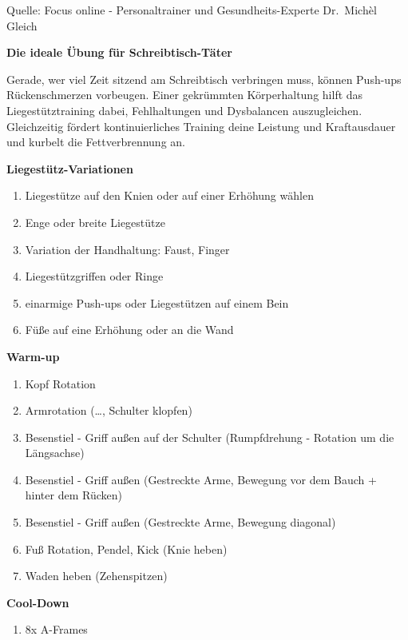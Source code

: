 Quelle: Focus online - Personaltrainer und Gesundheits-Experte
Dr.~Michèl Gleich

\textbf{Die ideale Übung für Schreibtisch-Täter}

Gerade, wer viel Zeit sitzend am Schreibtisch verbringen muss, können
Push-ups Rückenschmerzen vorbeugen. Einer gekrümmten Körperhaltung hilft
das Liegestütztraining dabei, Fehlhaltungen und Dysbalancen
auszugleichen. Gleichzeitig fördert kontinuierliches Training deine
Leistung und Kraftausdauer und kurbelt die Fettverbrennung an.

\textbf{Liegestütz-Variationen}

\begin{enumerate}
\item
  Liegestütze auf den Knien oder auf einer Erhöhung wählen
\item
  Enge oder breite Liegestütze
\item
  Variation der Handhaltung: Faust, Finger
\item
  Liegestützgriffen oder Ringe
\item
  einarmige Push-ups oder Liegestützen auf einem Bein
\item
  Füße auf eine Erhöhung oder an die Wand
\end{enumerate}

\newpage

\textbf{Warm-up}

\begin{enumerate}
\item
  Kopf Rotation
\item
  Armrotation (\ldots, Schulter klopfen)
\item
  Besenstiel - Griff außen auf der Schulter (Rumpfdrehung - Rotation um
  die Längsachse)
\item
  Besenstiel - Griff außen (Gestreckte Arme, Bewegung vor dem Bauch +
  hinter dem Rücken)
\item
  Besenstiel - Griff außen (Gestreckte Arme, Bewegung diagonal)
\item
  Fuß Rotation, Pendel, Kick (Knie heben)
\item
  Waden heben (Zehenspitzen)
\end{enumerate}

\textbf{Cool-Down}

\begin{enumerate}
\item
  8x A-Frames
\end{enumerate}

